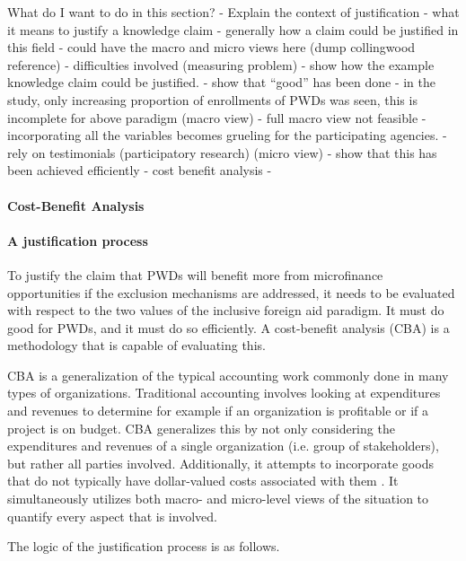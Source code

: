 \documentclass[a4paper]{article}
\begin{document}
What do I want to do in this section?
- Explain the context of justification
    - what it means to justify a knowledge claim
    - generally how a claim could be justified in this field
        - could have the macro and micro views here (dump collingwood
          reference)
        - difficulties involved (measuring problem)
- show how the example knowledge claim could be justified.
    - show that ``good'' has been done
        - in the study, only increasing proportion of enrollments of PWDs was
          seen, this is incomplete for above paradigm (macro view)
            - full macro view not feasible
                - incorporating all the variables becomes grueling for the
                participating agencies.
        - rely on testimonials (participatory research) (micro view)
    - show that this has been achieved efficiently
        - cost benefit analysis
-






\paragraph{Cost-Benefit Analysis}
\paragraph{A justification process}

To justify the claim that PWDs will benefit more from microfinance
opportunities if the exclusion mechanisms are addressed, it needs to be
evaluated with respect to the two values of the inclusive foreign aid
paradigm. It must do good for PWDs, and it must do so efficiently. A
cost-benefit analysis (CBA) is a methodology that is capable of evaluating
this.

CBA is a generalization of the typical accounting work commonly done in many
types of organizations. Traditional accounting involves looking at
expenditures and revenues to determine for example if an organization is
profitable or if a project is on budget. CBA generalizes this by not only
considering the expenditures and revenues of a single organization (i.e. group
of stakeholders), but rather all parties involved. Additionally, it attempts
to incorporate goods that do not typically have dollar-valued costs associated
with them \citep{mishan2015elements}. It simultaneously utilizes both macro-
and micro-level views of the situation to quantify every aspect that is
involved.

The logic of the justification process is as follows.
\end{document}
